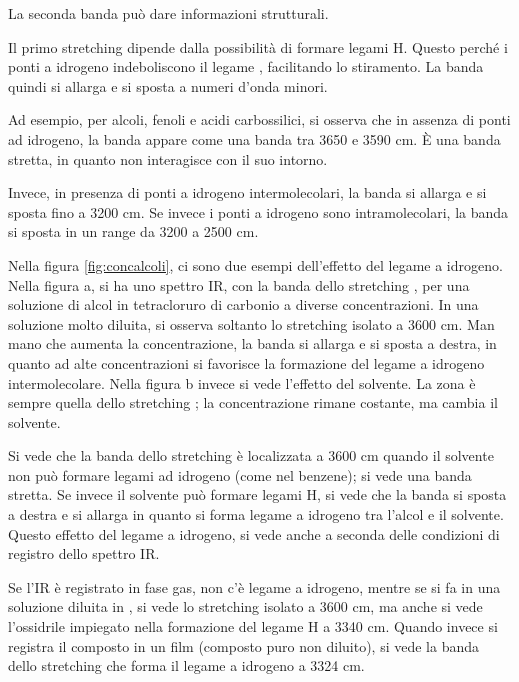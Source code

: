 La seconda banda può dare informazioni strutturali.

Il primo stretching  dipende dalla possibilità di formare legami H.
Questo perché i ponti a idrogeno indeboliscono il legame ,
facilitando lo stiramento. La banda quindi si allarga e si sposta a
numeri d'onda minori.

Ad esempio, per alcoli, fenoli e acidi carbossilici, si osserva che in
assenza di ponti ad idrogeno, la banda  appare come una banda tra 3650
e 3590 cm. È una banda stretta, in quanto non interagisce con il suo
intorno.

Invece, in presenza di ponti a idrogeno intermolecolari, la banda si
allarga e si sposta fino a 3200 cm. Se invece i ponti a idrogeno sono
intramolecolari, la banda si sposta in un range da 3200 a 2500 cm.



Nella figura \ref{fig:concalcoli}, ci sono due esempi dell'effetto del legame a idrogeno.
Nella figura a, si ha uno spettro IR, con la banda dello stretching ,
per una soluzione di alcol in tetracloruro di carbonio a diverse
concentrazioni. In una soluzione molto diluita, si osserva soltanto lo
stretching  isolato a 3600 cm.
Man mano che aumenta la concentrazione, la banda si allarga e si sposta
a destra, in quanto ad alte concentrazioni si favorisce la formazione
del legame a idrogeno intermolecolare.
Nella figura b invece si vede l'effetto del solvente. La zona è sempre
quella dello stretching ; la concentrazione rimane costante, ma cambia
il solvente.

Si vede che la banda dello stretching  è localizzata a 3600 cm
quando il solvente non può formare legami ad idrogeno (come nel
benzene); si vede una banda stretta.
Se invece il solvente può formare legami H, si vede che la banda si
sposta a destra e si allarga in quanto si forma legame a idrogeno tra l'alcol e
il solvente.
Questo effetto del legame a idrogeno, si vede anche a seconda delle condizioni di
registro dello spettro IR.


Se l'IR è registrato in fase gas, non c'è legame a idrogeno, mentre se si fa in
una soluzione diluita in , si vede lo stretching  isolato a 3600
cm, ma anche si vede l'ossidrile impiegato nella formazione del legame
H a 3340 cm. Quando invece si registra il composto in un film (composto puro non
diluito), si vede la banda dello stretching  che forma il legame a idrogeno a
3324 cm.

